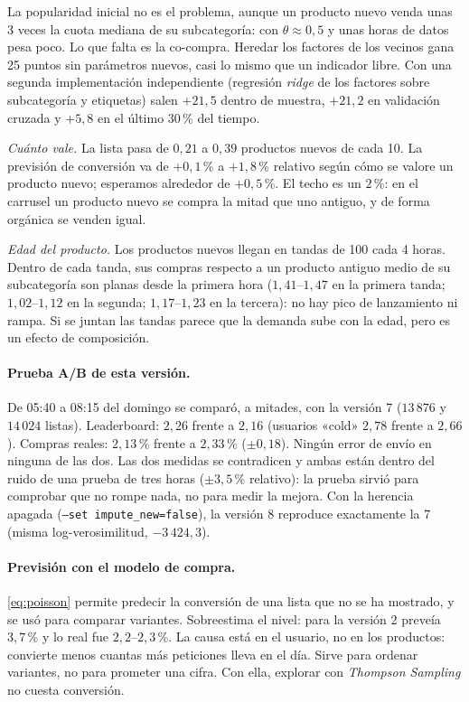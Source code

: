 \documentclass[11pt,a4paper]{article}
\newcommand{\cod}[1]{\texttt{#1}}
\begin{document}
La popularidad inicial no es el problema, aunque un producto nuevo venda unas 3 veces la cuota mediana de
su subcategoría: con $\theta\approx0{,}5$ y unas horas de datos pesa poco. Lo que falta es la co-compra.
Heredar los factores de los vecinos gana 25 puntos sin parámetros nuevos, casi lo mismo que un indicador
libre. Con una segunda implementación independiente (regresión \emph{ridge} de los factores sobre
subcategoría y etiquetas) salen $+21{,}5$ dentro de muestra, $+21{,}2$ en validación cruzada y $+5{,}8$
en el último 30\,\% del tiempo.

\emph{Cuánto vale.} La lista pasa de $0{,}21$ a $0{,}39$ productos nuevos de cada 10. La previsión de
conversión va de $+0{,}1$\,\% a $+1{,}8$\,\% relativo según cómo se valore un producto nuevo; esperamos
alrededor de $+0{,}5$\,\%. El techo es un $2$\,\%: en el carrusel un producto nuevo se compra la mitad que
uno antiguo, y de forma orgánica se venden igual.

\emph{Edad del producto.} Los productos nuevos llegan en tandas de 100 cada 4 horas. Dentro de cada tanda,
sus compras respecto a un producto antiguo medio de su subcategoría son planas desde la primera hora
($1{,}41$--$1{,}47$ en la primera tanda; $1{,}02$--$1{,}12$ en la segunda; $1{,}17$--$1{,}23$ en la
tercera): no hay pico de lanzamiento ni rampa. Si se juntan las tandas parece que la demanda sube con la
edad, pero es un efecto de composición.

\paragraph{Prueba A/B de esta versión.} De 05:40 a 08:15 del domingo se comparó, a mitades, con la
versión 7 ($13\,876$ y $14\,024$ listas). Leaderboard: $2{,}26$ frente a $2{,}16$ (usuarios «cold» $2{,}78$
frente a $2{,}66$). Compras reales: $2{,}13$\,\% frente a $2{,}33$\,\% ($\pm0{,}18$). Ningún error de envío en
ninguna de las dos. Las dos medidas se contradicen y ambas están dentro del ruido de una prueba de tres
horas ($\pm3{,}5$\,\% relativo): la prueba sirvió para comprobar que no rompe nada, no para medir la mejora. Con la herencia apagada
(\cod{--set impute\_new=false}), la versión 8 reproduce exactamente la 7 (misma log-verosimilitud,
$-3\,424{,}3$).

\paragraph{Previsión con el modelo de compra.} \eqref{eq:poisson} permite predecir la conversión de una
lista que no se ha mostrado, y se usó para comparar variantes. Sobreestima el nivel: para la versión 2
preveía $3{,}7$\,\% y lo real fue $2{,}2$--$2{,}3$\,\%. La causa está en el usuario, no en los productos:
convierte menos cuantas más peticiones lleva en el día. Sirve para ordenar variantes, no para prometer
una cifra. Con ella, explorar con \emph{Thompson Sampling} no cuesta conversión.
\end{document}
